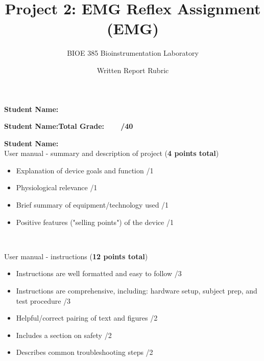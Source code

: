 \documentclass{article}
\title{Project 2: EMG Reflex Assignment (EMG)}
\author{BIOE 385 Bioinstrumentation Laboratory}
\date{Written Report Rubric}
\begin{document}
\large
\maketitle

\textbf{Student Name:}\vspace{0.5cm}

\textbf{Student Name:}\hfill 	\textbf{Total Grade:\ \ \ \ \underline{\hspace{1cm}}/40}\vspace{0.5cm}

\textbf{Student Name:}\hfill\\

User manual - summary and description of project (\textbf{4 points total})
\begin{small}
\begin{itemize}
	\item Explanation of device goals and function \hfill \underline{\hspace{1cm}}/1
	\item Physiological relevance \hfill \underline{\hspace{1cm}}/1
	\item Brief summary of equipment/technology used \hfill \underline{\hspace{1cm}}/1
	\item Positive features ("selling points") of the device \hfill \underline{\hspace{1cm}}/1
\end{itemize}
\end{small}\

User manual - instructions (\textbf{12 points total})
\begin{small}
\begin{itemize}
	\item Instructions are well formatted and easy to follow \hfill \underline{\hspace{1cm}}/3
	\item Instructions are comprehensive, including: hardware setup, subject prep, and test procedure \hfill \underline{\hspace{1cm}}/3
	\item Helpful/correct pairing of text and figures \hfill \underline{\hspace{1cm}}/2
	\item Includes a section on safety \hfill \underline{\hspace{1cm}}/2
	\item Describes common troubleshooting steps \hfill \underline{\hspace{1cm}}/2
\end{itemize}
\end{small}\
\end{document}
